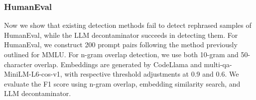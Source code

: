 
\subsubsection{HumanEval}
Now we show that existing detection methods fail to detect rephrased samples of HumanEval, while the LLM decontaminator succeeds in detecting them.
For HumanEval, we construct 200 prompt pairs following the method previously outlined for MMLU. For n-gram overlap detection, we use both 10-gram and 50-character overlap. Embeddings are generated by CodeLlama and multi-qa-MiniLM-L6-cos-v1, with respective threshold adjustments at 0.9 and 0.6. We evaluate the F1 score using n-gram overlap, embedding similarity search, and LLM decontaminator.



